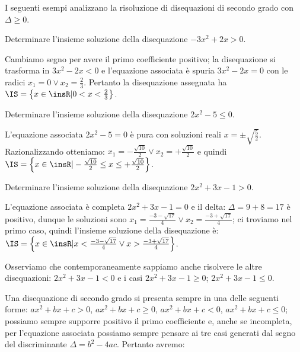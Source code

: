 I seguenti esempi analizzano la risoluzione di disequazioni di secondo grado con $\Delta \ge 0$.
\begin{exrig}
\begin{esempio}
Determinare l'insieme soluzione della disequazione $-3x^2+2x>0$.

Cambiamo segno per avere il primo coefficiente positivo; la disequazione si trasforma in $3x^2-2x<0$ e l'equazione associata è spuria $3x^2-2x=0$ con le radici $x_1=0\vee x_2=\frac 2 3$. Pertanto la disequazione assegnata ha $\IS=\left\{x\in \insR | 0<x<\frac 2 3\right\}$.
\end{esempio}

\begin{esempio}
Determinare l'insieme soluzione della disequazione $2x^2-5\le 0$.

L'equazione associata $2x^2-5=0$ è pura con soluzioni reali $x=\pm \sqrt{\frac 5 2}$. Razionalizzando otteniamo: $x_1=-\frac{\sqrt{10}} 2\vee x_2=+\frac{\sqrt{10}} 2$ e quindi $\IS=\left\{x\in \insR | -\frac{\sqrt{10}} 2\le x\le +\frac{\sqrt{10}} 2\right\}$.
\end{esempio}

\begin{esempio}
Determinare l'insieme soluzione della disequazione $2x^2+3x-1>0$.

L'equazione associata è completa $2x^2+3x-1=0$ e il delta: $\Delta =9+8=17$ è positivo, dunque le soluzioni sono $x_1=\frac{-3-\sqrt{17}} 4\vee x_2=\frac{-3+\sqrt{17}} 4$; ci troviamo nel primo caso, quindi l'insieme soluzione della disequazione è: $\IS=\left\{x\in \insR | x<\frac{-3-\sqrt{17}} 4\vee x>\frac{-3+\sqrt{17}} 4\right\}$.

Osserviamo che contemporaneamente sappiamo anche risolvere le altre disequazioni: $2x^2+3x-1<0$ e i casi $2x^2+3x-1\ge 0$; $2x^2+3x-1\le 0$.
\end{esempio}
\end{exrig}
\conclusione Una disequazione di secondo grado si presenta sempre in una delle seguenti forme: ${ax}^2+{bx}+c>0$, ${ax}^2+{bx}+c\ge 0$, ${ax}^2+{bx}+c<0$, ${ax}^2+{bx}+c\le 0$; possiamo sempre supporre positivo il primo coefficiente e, anche se incompleta, per l’equazione associata possiamo sempre pensare ai tre casi generati dal segno del discriminante $\Delta =b^2-4{ac}$. Pertanto avremo:
